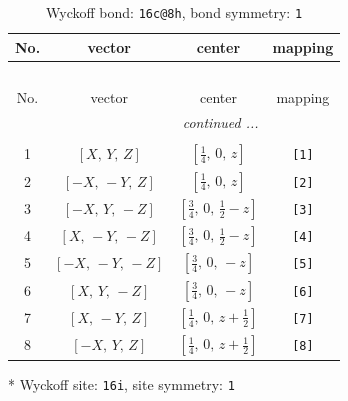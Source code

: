 \documentclass[fleqn,8pt]{jsarticle}
\begin{document}
\renewcommand{\arraystretch}{1.2}
\begin{longtable}{cccc}
\caption{Wyckoff bond: {\tt 16c@8h}, bond symmetry: {\tt 1}}
 \\
 \hline \hline
No. & vector & center & mapping \\ \hline \endfirsthead

\multicolumn{3}{l}{\tablename\ \thetable{}} \\
 \hline \hline
No. & vector & center & mapping \\ \hline \endhead

 \hline \hline
\multicolumn{3}{r}{\footnotesize\it continued ...} \\ \endfoot

 \hline \hline
\multicolumn{3}{r}{} \\ \endlastfoot

1 & $\left[ X,\, Y,\, Z \right]$ & $\left[ \frac{1}{4},\, 0,\, z \right]$ & {\tt [1]} \\ \hline
2 & $\left[ - X,\, - Y,\, Z \right]$ & $\left[ \frac{1}{4},\, 0,\, z \right]$ & {\tt [2]} \\ \hline
3 & $\left[ - X,\, Y,\, - Z \right]$ & $\left[ \frac{3}{4},\, 0,\, \frac{1}{2} - z \right]$ & {\tt [3]} \\ \hline
4 & $\left[ X,\, - Y,\, - Z \right]$ & $\left[ \frac{3}{4},\, 0,\, \frac{1}{2} - z \right]$ & {\tt [4]} \\ \hline
5 & $\left[ - X,\, - Y,\, - Z \right]$ & $\left[ \frac{3}{4},\, 0,\, - z \right]$ & {\tt [5]} \\ \hline
6 & $\left[ X,\, Y,\, - Z \right]$ & $\left[ \frac{3}{4},\, 0,\, - z \right]$ & {\tt [6]} \\ \hline
7 & $\left[ X,\, - Y,\, Z \right]$ & $\left[ \frac{1}{4},\, 0,\, z + \frac{1}{2} \right]$ & {\tt [7]} \\ \hline
8 & $\left[ - X,\, Y,\, Z \right]$ & $\left[ \frac{1}{4},\, 0,\, z + \frac{1}{2} \right]$ & {\tt [8]} \\
\end{longtable}
* Wyckoff site: {\tt 16i}, site symmetry: {\tt 1}
\renewcommand{\arraystretch}{1.2}
\end{document}

